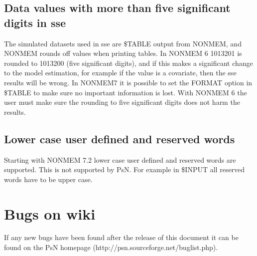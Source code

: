 \subsection{Data values with more than five significant digits in sse}
The simulated datasets used in sse are \$TABLE output from NONMEM, and NONMEM rounds off values when printing tables. In NONMEM 6 1013201 is rounded to 1013200 (five significant digits), and if this makes a significant change to the model estimation, for example if the value is a covariate, then the sse results will be wrong. In NONMEM7 it is possible to set the FORMAT option in \$TABLE to make sure no important information is lost. With NONMEM 6 the user must make sure the rounding to five significant digits does not harm the results.

\subsection{Lower case user defined and reserved words}
Starting with NONMEM 7.2 lower case user defined and reserved words are supported. This is not supported
by PsN. For example in \$INPUT all reserved words have to be upper case.

\section{Bugs on wiki}
If any new bugs have been found after the release of this document it can be found on the PsN homepage (http://psn.sourceforge.net/buglist.php).



